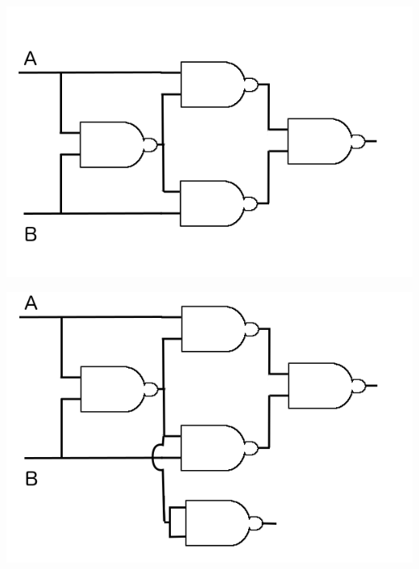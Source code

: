 \documentclass{article}
\begin{document}
	\begin{minipage}{.5\linewidth}
		\includegraphics[width=\linewidth]{figure/XOR1}
		\label{fig:XOR}
	\end{minipage}
	\begin{minipage}{.5\linewidth}
		\includegraphics[width=\linewidth]{figure/SOMMA1}
		\label{fig:sommatore}
	\end{minipage}\newline
\end{document}

